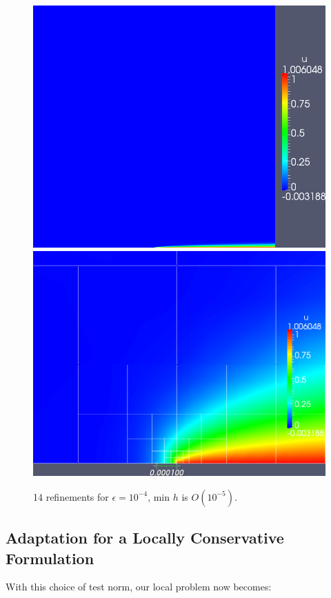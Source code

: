 \documentclass[letterpaper]{article}
\begin{document}
\begin{figure}[!h]
\centering
\includegraphics[scale=.25]{figs/LaplaceFigs/coupled1e4h1e5.png}
\includegraphics[scale=.227]{figs/LaplaceFigs/coupled1e4h1e5Zoom.png}
\caption{14 refinements for $\epsilon = 10^{-4}$, min $h$ is $O(10^{-5})$.}
\label{fig:newNormSmallEps}
\end{figure}

\subsection{Adaptation for a Locally Conservative Formulation}
With this choice of test norm, our local problem now becomes:
\end{document}
